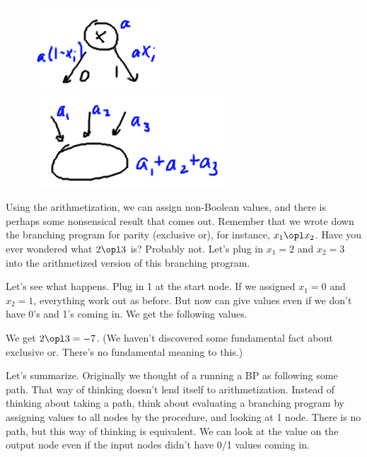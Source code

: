 \begin{center}
\begin{figure}[h!]
\includegraphics[scale=1.0]{23-7}
\qquad
\includegraphics[scale=1.0]{23-8}
\end{figure}
\end{center}

Using the arithmetization, we can assign non-Boolean values, and there is perhaps some nonsensical result that comes out. Remember that we wrote down the branching program for parity (exclusive or), for instance, $x_1\opl x_2$. Have you ever wondered what $2\opl 3$ is? Probably not. Let's plug in $x_1=2$ and $x_2=3$ into the arithmetized version of this branching program.

Let's see what happens. Plug in 1 at the start node. If we assigned $x_1= 0$ and $x_2=1$, everything work out as before. But now can give values even if we don't have 0's and 1's coming in. We get the following values.


We get $2\opl 3=-7$. (We haven't discovered some fundamental fact about exclusive or. There's no fundamental meaning to this.) %

Let's summarize. 
Originally we thought of a running a BP as following some path. That way of thinking doesn't lend itself to arithmetization. Instead of thinking about taking a path, think about evaluating a branching program by assigning values to all nodes by the procedure, and looking at 1 node. There is no path, but this way of thinking is  equivalent. We can look at the value on the output node even if the input nodes didn't have 0/1 values coming in.

